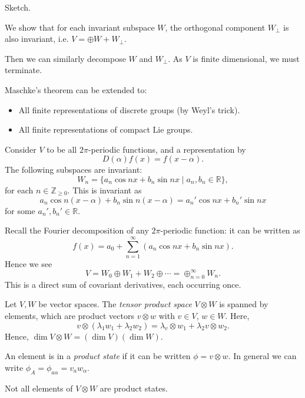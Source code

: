 \documentclass[12pt]{article}
\begin{document}
\begin{proofbox}
	Sketch.

	We show that for each invariant subspace $W$, the orthogonal component $W_{\perp}$ is also invariant, i.e. $V = \oplus W + W_{\perp}$.

	Then we can similarly decompose $W$ and $W_{\perp}$. As $V$ is finite dimensional, we must terminate.
\end{proofbox}

Maschke's theorem can be extended to:
\begin{itemize}
	\item All finite representations of discrete groups (by Weyl's trick).
	\item All finite representations of compact Lie groups.
\end{itemize}

\begin{exbox}
	Consider $V$ to be all $2\pi$-periodic functions, and a representation by
	\[
	D(\alpha) f(x) = f(x - \alpha).
	\]
	The following subspaces are invariant:
	\[
		W_n = \{a_n \cos n x + b_n \sin nx \mid a_n, b_n \in \mathbb{R} \},
	\]
	for each $n \in \mathbb{Z}_{\geq 0}$. This is invariant as
	\[
	a_n \cos n(x - \alpha) + b_n \sin n(x - \alpha) = a_n' \cos nx + b_n' \sin nx
	\]
	for some $a_n', b_n' \in \mathbb{R}$.

	Recall the Fourier decomposition of any $2\pi$-periodic function: it can be written as
	\[
	f(x) = a_0 + \sum_{n = 1}^\infty (a_n \cos nx + b_n \sin nx).
	\]
	Hence we see
	\[
	V = W_0 \oplus W_1 + W_2 \oplus \cdots = \oplus_{n = 0}^{\infty} W_n.
	\]
	This is a direct sum of covariant derivatives, each occurring once.
\end{exbox}

\begin{definition}
	Let $V, W$ be vector spaces. The \emph{tensor product space} $V \otimes W$ is spanned by elements, which are product vectors $v \otimes w$ with $v \in V$, $w \in W$. Here,
	\[
	v \otimes (\lambda_1 w_1 + \lambda_2 w_2) = \lambda_ v \otimes w_1  + \lambda_2 v \otimes w_2.
	\]
	Hence, $\dim V \otimes W = (\dim V)(\dim W)$.

	An element is in a \emph{product state} if it can be written $\phi = v\otimes w$. In general we can write $\phi_A = \phi_{a\alpha} = v_a w_\alpha$.

	Not all elements of $V \otimes W$ are product states.
\end{definition}
\end{document}
